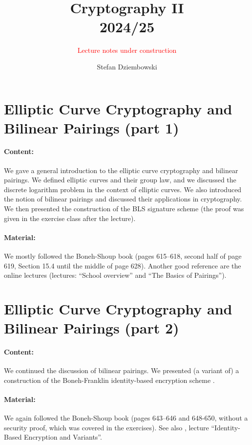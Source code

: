 \documentclass{llncs}
\title{Cryptography II\\ 2024/25}
\subtitle{\textcolor{red}{Lecture notes under construction}}
\author{Stefan Dziembowski}
\institute{University of Warsaw}
\begin{document}
\maketitle

\section{Elliptic Curve Cryptography and Bilinear Pairings (part 1)}


\paragraph{Content:} We gave a general introduction to the elliptic curve cryptography and bilinear pairings. We defined elliptic curves and their group law, and we discussed the discrete logarithm problem in the context of elliptic curves. We also introduced the notion of bilinear pairings and discussed their applications in cryptography. We then presented the construction of the BLS signature scheme \cite{Boneh2001} (the proof was given in the exercise class after the lecture).

\paragraph{Material:} We mostly followed the Boneh-Shoup book \cite{Cryptobook} (pages 615--618, second half of page 619, Section 15.4 until the middle of page 628). Another good reference are the online lectures \cite{WinterSchool} (lectures: ``School overview'' and ``The Basics of Pairings'').



\section{Elliptic Curve Cryptography and Bilinear Pairings (part 2)}


\paragraph{Content:} We continued the discussion of bilinear pairings. We presented (a variant of) a construction of the Boneh-Franklin identity-based encryption scheme \cite{Boneh2003}.

\paragraph{Material:} We again followed the Boneh-Shoup book \cite{Cryptobook} (pages 643--646 and 648-650, without a security proof, which was covered in the exercises). See also \cite{WinterSchool}, lecture ``Identity-Based Encryption and Variants''.
\end{document}
